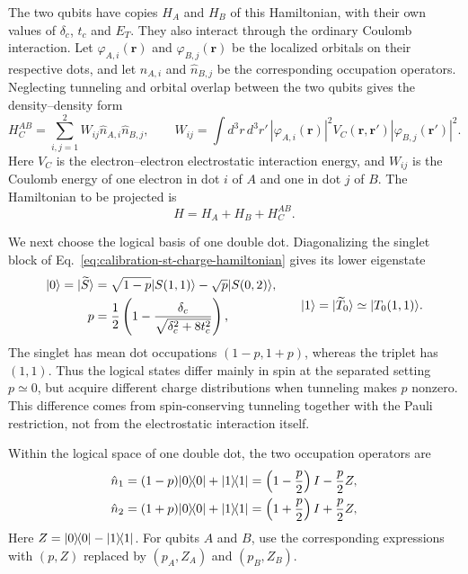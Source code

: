 The two qubits have copies $H_A$ and $H_B$ of this Hamiltonian, with
their own values of $\delta_c$, $t_c$ and $E_T$. They also interact
through the ordinary Coulomb interaction. Let
$\varphi_{A,i}(\mathbf r)$ and $\varphi_{B,j}(\mathbf r)$ be the
localized orbitals on their respective dots, and let
$\hat n_{A,i}$ and $\hat n_{B,j}$ be the corresponding occupation
operators. Neglecting tunneling and orbital overlap between the two
qubits gives the density--density form
\begin{equation}
 H_C^{AB}=\sum_{i,j=1}^{2}W_{ij}\hat n_{A,i}\hat n_{B,j},
 \qquad
 W_{ij}=\int d^3r\,d^3r'\,
 |\varphi_{A,i}(\mathbf r)|^2
 V_C(\mathbf r,\mathbf r')
 |\varphi_{B,j}(\mathbf r')|^2.
 \label{eq:calibration-density-density-hamiltonian}
\end{equation}
Here $V_C$ is the electron--electron electrostatic interaction
energy, and $W_{ij}$ is the Coulomb energy of one electron in dot
$i$ of $A$ and one in dot $j$ of $B$. The Hamiltonian to be
projected is
\begin{equation}
 H=H_A+H_B+H_C^{AB}.
 \label{eq:calibration-two-st-full-hamiltonian}
\end{equation}

We next choose the logical basis of one double dot. Diagonalizing the singlet block of
Eq.~\eqref{eq:calibration-st-charge-hamiltonian} gives its lower
eigenstate
\begin{equation}
 \begin{aligned}
 \ket0=\ket{\widetilde S}
 &=\sqrt{1-p}\ket{S(1,1)}
   -\sqrt p\ket{S(0,2)},\\
 p&=\frac12\left(1-\frac{\delta_c}
                 {\sqrt{\delta_c^2+8t_c^2}}\right),
 \end{aligned}
 \qquad
 \ket1=\ket{\widetilde T_0}
 \simeq\ket{T_0(1,1)}.
 \label{eq:calibration-st-logical-charge-basis}
\end{equation}
The singlet has mean dot occupations $(1-p,1+p)$, whereas the
triplet has $(1,1)$. Thus the logical states differ mainly in spin
at the separated setting $p\simeq0$, but acquire different charge
distributions when tunneling makes $p$ nonzero. This difference
comes from spin-conserving tunneling together with the Pauli
restriction, not from the electrostatic interaction itself.

Within the logical space of one double dot, the two occupation
operators are
\begin{equation}
 \begin{aligned}
 \hat n_1
 &=(1-p)\ket0\!\bra0+\ket1\!\bra1
  =\left(1-\frac p2\right)I-\frac p2Z,\\
 \hat n_2
 &=(1+p)\ket0\!\bra0+\ket1\!\bra1
  =\left(1+\frac p2\right)I+\frac p2Z,
 \end{aligned}
 \label{eq:calibration-projected-capacitive-hamiltonian}
\end{equation}
Here $Z=\lvert 0\rangle\!\langle 0\rvert-\lvert 1\rangle\!\langle 1\rvert$. For qubits $A$ and $B$, use
the corresponding expressions with $(p,Z)$ replaced by
$(p_A,Z_A)$ and $(p_B,Z_B)$.

